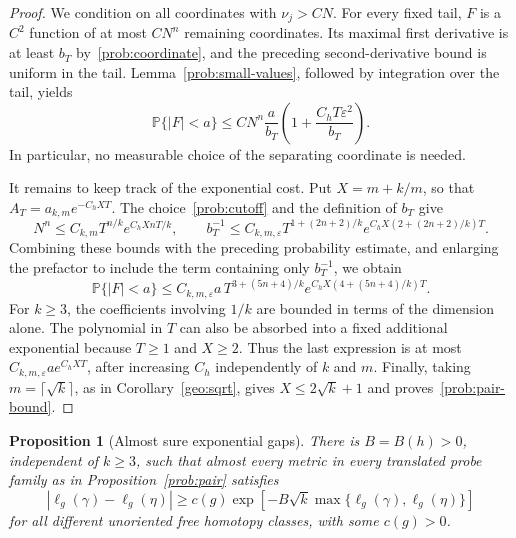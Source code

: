 \documentclass[10pt,oneside,reqno]{amsproc}
\numberwithin{equation}{section}
\newtheorem{proposition}[theorem]{Proposition}
\theoremstyle{definition}
\theoremstyle{remark}
\newcommand{\eps}{\varepsilon}
\renewcommand{\ge}{\geqslant}
\renewcommand{\le}{\leqslant}
\begin{document}
\begin{proof}
We condition on all coordinates with $\nu_j>CN$. For every fixed tail, $F$ is a $C^2$ function of at most $CN^n$ remaining coordinates. Its maximal first derivative is at least $b_T$ by~\eqref{prob:coordinate}, and the preceding second-derivative bound is uniform in the tail. Lemma~\ref{prob:small-values}, followed by integration over the tail, yields
\[
 \mathbb P\{|F|<a\}\le CN^n\frac{a}{b_T}\left(1+\frac{C_hT\eps^2}{b_T}\right).
\]
In particular, no measurable choice of the separating coordinate is needed.

It remains to keep track of the exponential cost. Put $X=m+k/m$, so that $A_T=a_{k,m}e^{-C_hXT}$. The choice~\eqref{prob:cutoff} and the definition of $b_T$ give
\[
 N^n\le C_{k,m}T^{n/k}e^{C_hXnT/k},\qquad b_T^{-1}\le C_{k,m,\eps}T^{1+(2n+2)/k}e^{C_hX(2+(2n+2)/k)T}.
\]
Combining these bounds with the preceding probability estimate, and enlarging the prefactor to include the term containing only $b_T^{-1}$, we obtain
\[
 \mathbb P\{|F|<a\}\le C_{k,m,\eps}a\,T^{3+(5n+4)/k}e^{C_hX(4+(5n+4)/k)T}.
\]
For $k\ge3$, the coefficients involving $1/k$ are bounded in terms of the dimension alone. The polynomial in $T$ can also be absorbed into a fixed additional exponential because $T\ge1$ and $X\ge2$. Thus the last expression is at most $C_{k,m,\eps}a e^{C_hXT}$, after increasing $C_h$ independently of $k$ and $m$. Finally, taking $m=\lceil\sqrt{k}\rceil$, as in Corollary~\ref{geo:sqrt}, gives $X\le2\sqrt{k}+1$ and proves~\eqref{prob:pair-bound}.
\end{proof}


\begin{proposition}[Almost sure exponential gaps]
\label{prob:gaps}
There is $B=B(h)>0$, independent of $k\ge3$, such that almost every metric in every translated probe family as in Proposition~\ref{prob:pair} satisfies
\begin{equation}
 |\ell_g(\gamma)-\ell_g(\eta)|\ge c(g)\exp\left[-B\sqrt{k}\max\{\ell_g(\gamma),\ell_g(\eta)\}\right]
 \label{prob:gap-property}
\end{equation}
for all different unoriented free homotopy classes, with some $c(g)>0$.
\end{proposition}
\end{document}
